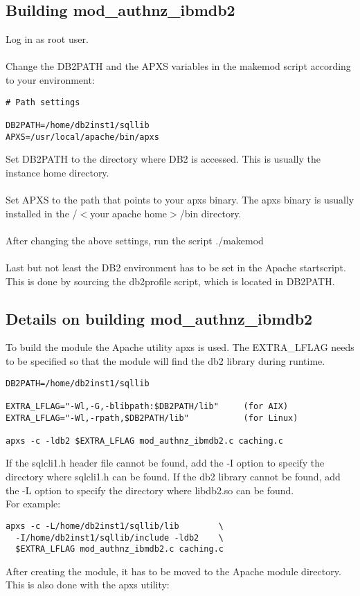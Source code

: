 \documentclass[11pt,letterpaper]{scrartcl}
\def\tt{\normalfont\ttfamily}
\begin{document}
\subsection{Building mod\_authnz\_ibmdb2}
Log in as root user.\\
\\
Change the {\tt DB2PATH} and the {\tt APXS} variables in the {\tt makemod} script according to your environment:
\begin{verbatim}
# Path settings

DB2PATH=/home/db2inst1/sqllib
APXS=/usr/local/apache/bin/apxs
\end{verbatim}
Set {\tt DB2PATH} to the directory where DB2 is accessed. This is usually the instance home directory.\\
\\
Set {\tt APXS} to the path that points to your apxs binary. The apxs binary is usually installed in the /$<$your apache home$>$/bin directory.\\
\\
After changing the above settings, run the script {\tt ./makemod}\\
\\
Last but not least the DB2 environment has to be set in the Apache startscript. This is done by sourcing the {\tt db2profile} script, which is located in {\tt DB2PATH}.
\subsection{Details on building mod\_authnz\_ibmdb2}
To build the module the Apache utility {\tt apxs} is used. The {\tt EXTRA\_LFLAG} needs to be specified so that the module will find the db2 library during runtime.
\begin{verbatim}
DB2PATH=/home/db2inst1/sqllib

EXTRA_LFLAG="-Wl,-G,-blibpath:$DB2PATH/lib"     (for AIX)
EXTRA_LFLAG="-Wl,-rpath,$DB2PATH/lib"           (for Linux)

apxs -c -ldb2 $EXTRA_LFLAG mod_authnz_ibmdb2.c caching.c
\end{verbatim}
If the {\tt sqlcli1.h} header file cannot be found, add the {\tt -I} option to specify the
directory where {\tt sqlcli1.h} can be found.
If the db2 library cannot be found, add the {\tt -L} option to specify the
directory where {\tt libdb2.so} can be found.\\

For example:
\begin{verbatim}
apxs -c -L/home/db2inst1/sqllib/lib        \
  -I/home/db2inst1/sqllib/include -ldb2    \
  $EXTRA_LFLAG mod_authnz_ibmdb2.c caching.c
\end{verbatim}
After creating the module, it has to be moved to the Apache module directory. This is also done with the apxs utility:
\end{document}
